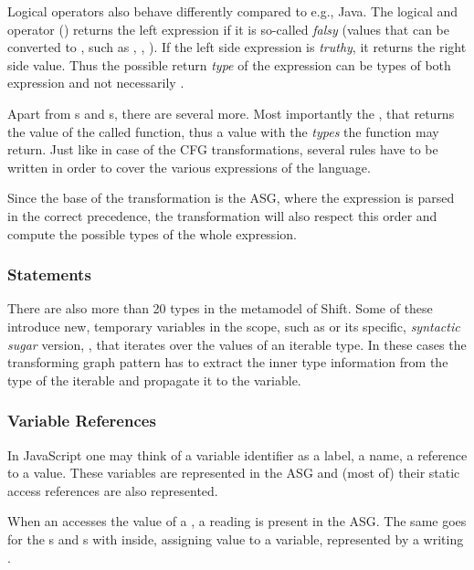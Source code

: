 Logical operators also behave differently compared to e.g., Java. The logical and operator (\code{\&\&}) returns the left expression if it is so-called \emph{falsy} (values that can be converted to , such as , , ). If the left side expression is \emph{truthy}, it returns the right side value. Thus the possible return \emph{type} of the expression can be types of both expression and not necessarily .

Apart from s and s, there are several more. Most importantly the , that returns the value of the called function, thus a value with the \emph{types} the function may return. Just like in case of the CFG transformations, several rules have to be written in order to cover the various expressions of the language.

Since the base of the transformation is the ASG, where the expression is parsed in the correct precedence, the transformation will also respect this order and compute the possible types of the whole expression.

\subsubsection{Statements}
There are also more than 20  types in the metamodel of Shift. Some of these introduce new, temporary variables in the scope, such as  or its specific, \emph{syntactic sugar} version, , that iterates over the values of an iterable type. In these cases the transforming graph pattern has to extract the inner type information from the type of the iterable and propagate it to the variable.

\subsubsection{Variable References}
In JavaScript one may think of a variable identifier as a label, a name, a reference to a value. These variables are represented in the ASG and (most of) their static access references are also represented.

When an  accesses the value of a , a reading  is present in the ASG. The same goes for the s and s with  inside, assigning value to a variable, represented by a writing .

